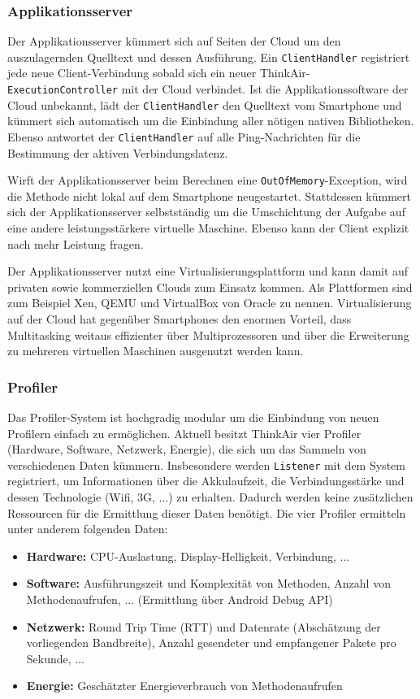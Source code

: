 \documentclass{sigchi}
\begin{document}
\subsubsection{Applikationsserver}

Der Applikationsserver kümmert sich auf Seiten der Cloud um den auszulagernden Quelltext und dessen Ausführung.
Ein \texttt{ClientHandler} registriert jede neue Client-Verbindung sobald sich ein neuer ThinkAir-\texttt{ExecutionController} mit der Cloud verbindet.
Ist die Applikationssoftware der Cloud unbekannt, lädt der \texttt{ClientHandler} den Quelltext vom Smartphone und kümmert sich automatisch um die Einbindung aller nötigen nativen Bibliotheken.
Ebenso antwortet der \texttt{ClientHandler} auf alle Ping-Nachrichten für die Bestimmung der aktiven Verbindungslatenz.

Wirft der Applikationsserver beim Berechnen eine \texttt{OutOfMemory}-Exception, wird die Methode nicht lokal auf dem Smartphone neugestartet.
Stattdessen kümmert sich der Applikationsserver selbstständig um die Umschichtung der Aufgabe auf eine andere leistungsstärkere virtuelle Maschine.
Ebenso kann der Client explizit nach mehr Leistung fragen.

Der Applikationsserver nutzt eine Virtualisierungsplattform und kann damit auf privaten sowie kommerziellen Clouds zum Einsatz kommen.
Als Plattformen sind zum Beispiel Xen, QEMU und VirtualBox von Oracle zu nennen.
Virtualisierung auf der Cloud hat gegenüber Smartphones den enormen Vorteil, dass Multitasking weitaus effizienter über Multiprozessoren und über die Erweiterung zu mehreren virtuellen Maschinen ausgenutzt werden kann.

\subsubsection{Profiler}

Das Profiler-System ist hochgradig modular um die Einbindung von neuen Profilern einfach zu ermöglichen.
Aktuell besitzt ThinkAir vier Profiler (Hardware, Software, Netzwerk, Energie), die sich um das Sammeln von verschiedenen Daten kümmern.
Insbesondere werden \texttt{Listener} mit dem System registriert, um Informationen über die Akkulaufzeit, die Verbindungsstärke und dessen Technologie (Wifi, 3G, ...) zu erhalten.
Dadurch werden keine zusätzlichen Ressourcen für die Ermittlung dieser Daten benötigt.
Die vier Profiler ermitteln unter anderem folgenden Daten:
\begin{itemize}
	\item \textbf{Hardware:} CPU-Auslastung, Display-Helligkeit, Verbindung, ...
	\item \textbf{Software:} Ausführungszeit und Komplexität von Methoden, Anzahl von Methodenaufrufen, ... (Ermittlung über Android Debug API)
	\item \textbf{Netzwerk:} Round Trip Time (RTT) und Datenrate (Abschätzung der vorliegenden Bandbreite), Anzahl gesendeter und empfangener Pakete pro Sekunde, ...
	\item \textbf{Energie:} Geschätzter Energieverbrauch von Methodenaufrufen
\end{itemize}
\end{document}
